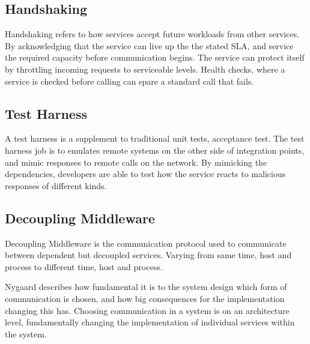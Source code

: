\subsection{Handshaking}
Handshaking refers to how services accept future workloads from other services. By acknowledging that the service can live up the the stated SLA, and service the required capacity before communication begins. The service can protect itself by throttling incoming requests to serviceable levels. Health checks, where a service is checked before calling can spare a standard call that fails.

\subsection{Test Harness}
A test harness is a supplement to traditional unit tests, acceptance test. The test harness job is to emulates remote systems on the other side of integration points, and mimic responses to remote calls on the network. By mimicking the dependencies, developers are able to test how the service reacts to malicious responses of different kinds.

\subsection{Decoupling Middleware}
Decoupling Middleware is the communication protocol used to communicate between dependent but decoupled services. Varying from same time, host and process to different time, host and process.

Nygaard describes how fundamental it is to the system design which form of communication is chosen, and how big consequences for the implementation changing this has. Choosing communication in a system is on an architecture level, fundamentally changing the implementation of individual services within the system.


